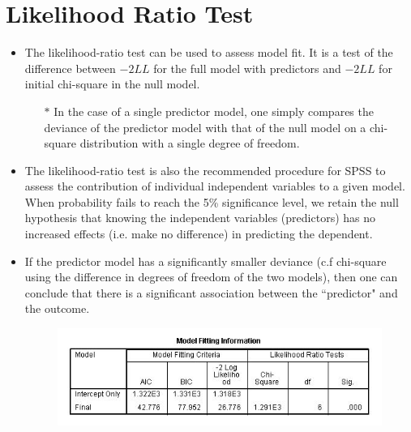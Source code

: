 \documentclass[a4paper,12pt]{article}
\begin{document}


\section*{Likelihood Ratio Test}
\begin{itemize}
	\item The likelihood-ratio test can be used to assess model fit. It is a test of the difference between $-2LL$ for the full
	model with predictors and $-2LL$ for initial chi-square in the null model.
	\begin{itemize}
		\item[$\ast$] In the case of a single predictor model, one simply compares the deviance of the predictor model with that of the null model on a chi-square distribution with a single degree of freedom.
	\end{itemize}
	
	
	
	\item The likelihood-ratio test is also the recommended procedure for SPSS to assess the contribution of individual independent variables to a given model. When probability fails to reach the 5\% significance level, we retain the null hypothesis that knowing the independent variables (predictors) has no increased effects (i.e. make no difference) in predicting the dependent.



 
\item If the predictor model has a significantly smaller deviance (c.f chi-square using the difference in degrees of freedom of the two models), then one can conclude that there is a significant association between the ``predictor" and the outcome. 


	\begin{figure}[h!]
		\centering
		\includegraphics[scale=0.8]{images/Logistic7X}
	\end{figure}



\end{itemize}
\end{document}
